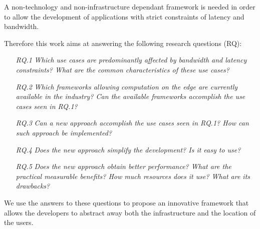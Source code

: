 A non-technology and non-infrastructure dependant framework is needed in order to allow the development of applications with strict constraints of latency and bandwidth.

Therefore this work aims at answering the following research questions (RQ):
\begin{itemize}
    \item[\textit{RQ.1}]\emph{Which use cases are predominantly affected by bandwidth and latency constraints? What are the common characteristics of these use cases?}
    
    \item[\textit{RQ.2}]\emph{Which frameworks allowing computation on the edge are currently available in the industry? Can the available frameworks accomplish the use cases seen in RQ.1?}
    
    \item[\textit{RQ.3}]\emph{Can a new approach accomplish the use cases seen in RQ.1? How can such approach be implemented?}
    
    \item[\textit{RQ.4}]\emph{Does the new approach simplify the development? Is it easy to use?}
    
    \item[\textit{RQ.5}]\emph{Does the new approach obtain better performance? What are the practical measurable benefits? How much resources does it use? What are its drawbacks?}
\end{itemize}

We use the answers to these questions to propose an innovative framework that allows the developers to abstract away both the infrastructure and the location of the users.

